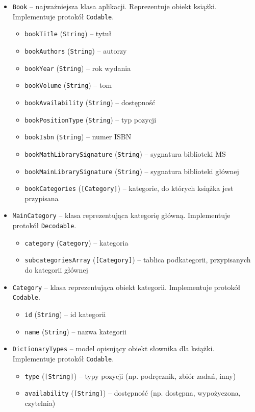 \documentclass[twoside]{projektInzynierskiMS}
\begin{document}
\begin{itemize}
\item \verb`Book` -- najważniejsza klasa aplikacji. Reprezentuje obiekt książki. Implementuje protokół \verb`Codable`.
\begin{itemize}
\item \verb`bookTitle` (\verb`String`) -- tytuł
\item \verb`bookAuthors` (\verb`String`) -- autorzy
\item \verb`bookYear` (\verb`String`) -- rok wydania
\item \verb`bookVolume` (\verb`String`) -- tom
\item \verb`bookAvailability` (\verb`String`) -- dostępność
\item \verb`bookPositionType` (\verb`String`) -- typ pozycji
\item \verb`bookIsbn` (\verb`String`) -- numer ISBN
\item \verb`bookMathLibrarySignature` (\verb`String`) -- sygnatura biblioteki MS
\item \verb`bookMainLibrarySignature` (\verb`String`) -- sygnatura biblioteki głównej
\item \verb`bookCategories` (\verb`[Category]`) -- kategorie, do których książka jest przypisana
\end{itemize}
\item \verb`MainCategory` -- klasa reprezentująca kategorię główną. Implementuje protokół \verb`Decodable`.
\begin{itemize}
\item \verb`category` (\verb`Category`) -- kategoria
\item \verb`subcategoriesArray` (\verb`[Category]`) -- tablica podkategorii, przypisanych do kategorii głównej
\end{itemize}
\item \verb`Category` -- klasa reprezentująca obiekt kategorii. Implementuje protokół \verb`Codable`.
\begin{itemize}
\item \verb`id` (\verb`String`) -- id kategorii
\item \verb`name` (\verb`String`) -- nazwa kategorii
\end{itemize}
\item \verb`DictionaryTypes` -- model opisujący obiekt słownika dla książki. Implementuje protokół \verb`Codable`.
\begin{itemize}
\item \verb`type` (\verb`[String]`) -- typy pozycji (np. podręcznik, zbiór zadań, inny)
\item \verb`availability` (\verb`[String]`) -- dostępność (np. dostępna, wypożyczona, czytelnia)
\end{itemize}
\end{itemize}
\end{document}
